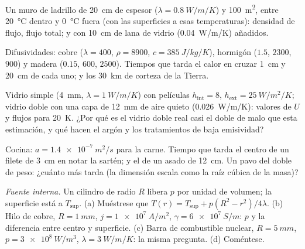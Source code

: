 \begin{exercise}[$\star$]\label{exo:b2:heat-conduction:1}
Un muro de ladrillo de \qty{20}{cm} de espesor ($\lambda = \qty{0.8}{W/m/K}$) y \qty{100}{m^2},
entre \qty{20}{\celsius} dentro y \qty{0}{\celsius} fuera
(con las superficies a esas temperaturas): densidad de flujo, flujo total; y con
\qty{10}{cm} de lana de vidrio (\qty{0.04}{W/m/K}) añadidos.
\end{exercise}

\begin{exercise}[$\star$]\label{exo:b2:heat-conduction:2}
Difusividades: cobre ($\lambda = 400$, $\rho = 8900$, $c = \qty{385}{J/kg/K}$),
hormigón ($1.5$, $2300$, $900$) y madera ($0.15$, $600$, $2500$). Tiempos que tarda el calor
en cruzar \qty{1}{cm} y \qty{20}{cm} de cada uno; y los \qty{30}{km} de corteza de
la Tierra.
\end{exercise}

\begin{exercise}[$\star$]\label{exo:b2:heat-conduction:3}
Vidrio simple (\qty{4}{mm}, $\lambda = \qty{1}{W/m/K}$) con películas $h_{\text{int}}
= 8$, $h_{\text{ext}} = \qty{25}{W/m^2/K}$; vidrio doble con una capa de \qty{12}{mm}
de aire quieto (\qty{0.026}{W/m/K}): valores de $U$ y flujos para
\qty{20}{K}. ¿Por qué es el vidrio doble real casi el doble de malo que esta
estimación, y qué hacen el argón y los tratamientos de baja emisividad?
\end{exercise}

\begin{exercise}[$\star$]\label{exo:b2:heat-conduction:4}
Cocina: $a = \qty{1.4e-7}{m^2/s}$ para la carne. Tiempo que tarda el centro de un
filete de \qty{3}{cm} en notar la sartén; y el de un asado de \qty{12}{cm}. Un pavo
del doble de peso: ¿cuánto más tarda (la dimensión escala como la raíz cúbica
de la masa)?
\end{exercise}

\begin{exercise}[$\star\star$]\label{exo:b2:heat-conduction:5}
\emph{Fuente interna.} Un cilindro de radio $R$ libera $p$ por unidad de
volumen; la superficie está a $T_{\text{sup}}$. (a) Muéstrese que $T(r) = T_{\text{sup}} +
p(R^2 - r^2)/4\lambda$. (b) Hilo de cobre, $R = \qty{1}{mm}$, $j =
\qty{1e7}{A/m^2}$, $\gamma = \qty{6e7}{S/m}$: $p$ y la diferencia entre centro y
superficie. (c) Barra de combustible nuclear, $R = \qty{5}{mm}$, $p = \qty{3e8}{W/m^3}$,
$\lambda = \qty{3}{W/m/K}$: la misma pregunta. (d) Coméntese.
\end{exercise}

